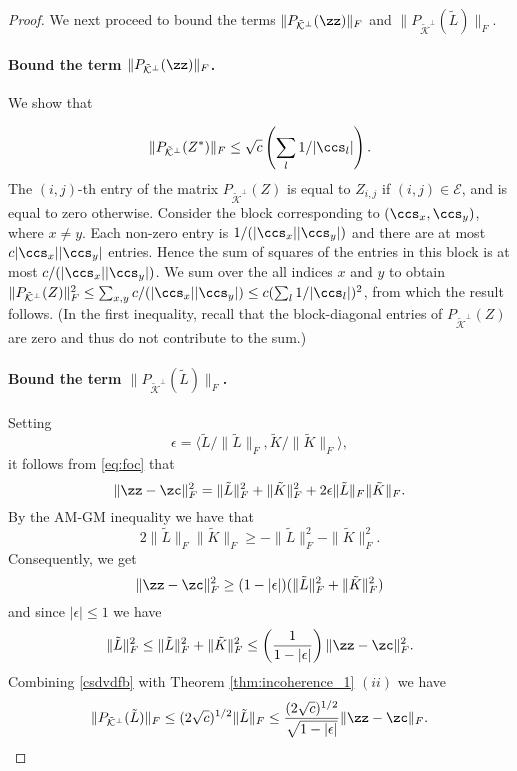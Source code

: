 \begin{proof}
We next proceed to bound the terms $\|P_{\tilde{\mathcal{K}}^\perp} (\zz) \|_F$ and $  \| P_{\tilde{\mathcal{K}}^\perp}(\tilde{L}) \|_F$.


\paragraph{ Bound  the term $  \| P_{\tilde{\mathcal{K}}^\perp} (\zz) \|_F $.} We show that

\begin{equation}\label{csvdgb}
\| P_{\tilde{\mathcal{K}}^\perp}(Z^*) \|_F \leq \sqrt{c} \left(\sum_l 1/|\ccs_l|\right).
\end{equation}
The $(i,j)$-th entry of the matrix $P_{\tilde{\mathcal{K}}^\perp}(Z)$ is equal to $Z_{i,j}$ if $(i,j) \in \mathcal{E}$, and is equal to zero otherwise.  Consider the block corresponding to $(\ccs_x,\ccs_y)$, where $x\neq y$.  Each non-zero entry is $1/(|\ccs_x||\ccs_y|)$ and there are at most $c |\ccs_x||\ccs_y|$ entries.  Hence the sum of squares of the entries in this block is at most $c / (|\ccs_x||\ccs_y|)$.  We sum over the all indices $x$ and $y$ to obtain $\| P_{\tilde{\mathcal{K}}^\perp}(Z) \|_F^2  \leq \sum_{x,y} c / (|\ccs_x||\ccs_y|) \leq c (\sum_l 1/|\ccs_l|)^2$, from which the result follows.  (In the first inequality, recall that the block-diagonal entries of $P_{\tilde{\mathcal{K}}^\perp}(Z)$ are zero and thus do not contribute to the sum.)

\paragraph{Bound the term  $ \| P_{\tilde{\mathcal{K}}^\perp}(\tilde{L}) \|_F$.}  Setting   
 $$\epsilon = \langle \tilde{L} / \|\tilde{L}\|_F, \tilde{K} / \|\tilde{K}\|_F \rangle,$$
   it follows  from \eqref{eq:foc} that  
$$\| \zz - \zc \|_F^2 = \| \tilde{L} \|_F^2 + \| \tilde{K} \|_F^2 + 2 \epsilon\| \tilde{L} \|_F  \| \tilde{K} \|_F .$$  By the AM-GM inequality we have that 
$$ 2\| \tilde{L} \|_F   \| \tilde{K} \|_F\ge -\| \tilde{L} \|_F^2 - \| \tilde{K} \|_F^2.$$
Consequently, we get  
$$\| \zz - \zc \|_F^2 \geq (1-|\epsilon|)(\| \tilde{L} \|_F^2 + \| \tilde{K} \|_F^2)$$ and since $|\epsilon|\le 1$ we have 
\begin{equation}\label{csdvdfb}
\| \tilde{L} \|_F^2 \le \| \tilde{L} \|_F^2 + \| \tilde{K} \|_F^2 \leq \left(\frac{1}{1-|\epsilon|}\right) \| \zz - \zc \|_F^2.
\end{equation}
Combining \eqref{csdvdfb} with Theorem \ref{thm:incoherence_1} $ (ii)$   we have
\begin{equation}\label{xsdvdfv}
\| P_{\tilde{\mathcal{K}}^\perp}(\tilde{L}) \|_F \leq (2\sqrt{c})^{1/2} \|\tilde{L}\|_F \leq { (2\sqrt{c})^{1/2} \over \sqrt{1-|\epsilon|}} \| \zz - \zc \|_F.
\end{equation}


\end{proof}
